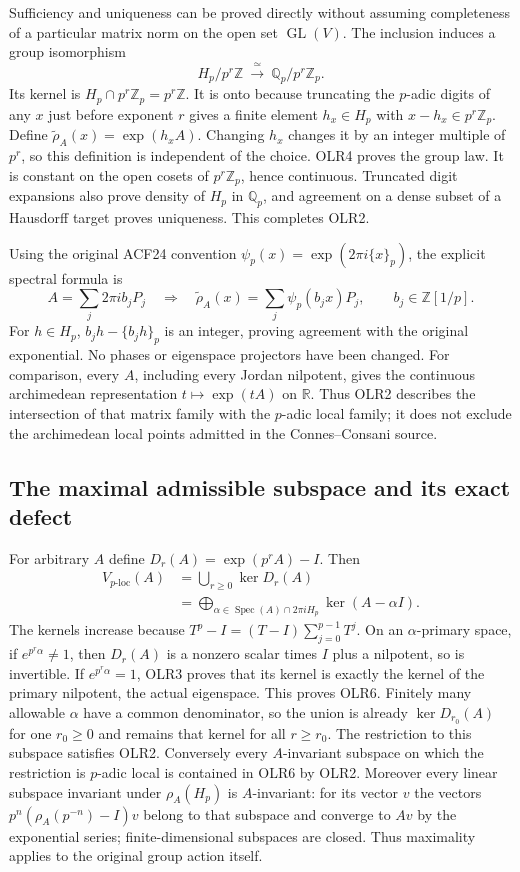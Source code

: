 Sufficiency and uniqueness can be proved directly without assuming
completeness of a particular matrix norm on the open set
$\operatorname{GL}(V)$. The inclusion induces a group isomorphism
\[
H_p/p^r\mathbb Z\ \xrightarrow{\ \simeq\ }\
                    \mathbb Q_p/p^r\mathbb Z_p.
\tag{OLR4}
\]
Its kernel is $H_p\cap p^r\mathbb Z_p=p^r\mathbb Z$.
It is onto because truncating the $p$-adic digits of any $x$ just
before exponent $r$ gives a finite element $h_x\in H_p$ with
$x-h_x\in p^r\mathbb Z_p$. Define
$\widetilde\rho_A(x)=\exp(h_xA)$.
Changing $h_x$ changes it by an integer multiple of $p^r$, so this
definition is independent of the choice. OLR4 proves the group law.
It is constant on the open cosets of $p^r\mathbb Z_p$, hence
continuous. Truncated digit expansions also prove density of $H_p$
in $\mathbb Q_p$, and agreement on a dense subset of a Hausdorff
target proves uniqueness. This completes OLR2.

Using the original ACF24 convention
$\psi_p(x)=\exp(2\pi i\{x\}_p)$, the explicit spectral formula is
\[
A=\sum_j2\pi i b_jP_j\quad\Longrightarrow\quad
\widetilde\rho_A(x)=\sum_j\psi_p(b_jx)P_j,
\qquad b_j\in\mathbb Z[1/p].
\tag{OLR5}
\]
For $h\in H_p$, $b_jh-\{b_jh\}_p$ is an integer, proving agreement
with the original exponential. No phases or eigenspace projectors
have been changed.
For comparison, every $A$, including every Jordan nilpotent, gives
the continuous archimedean representation $t\mapsto\exp(tA)$ on
$\mathbb R$. Thus OLR2 describes the intersection of that matrix
family with the $p$-adic local family; it does not exclude the
archimedean local points admitted in the Connes--Consani source.

\subsection{The maximal admissible subspace and its exact defect}

For arbitrary $A$ define $D_r(A)=\exp(p^rA)-I$. Then
\[
\begin{split}
V_{p\text{-loc}}(A)
&=\bigcup_{r\ge0}\ker D_r(A)\\
&=\bigoplus_{\alpha\in\operatorname{Spec}(A)\cap2\pi iH_p}
                             \ker(A-\alpha I).
\end{split}
\tag{OLR6}
\]
The kernels increase because $T^p-I=(T-I)\sum_{j=0}^{p-1}T^j$.
On an $\alpha$-primary space, if $e^{p^r\alpha}\ne1$, then
$D_r(A)$ is a nonzero scalar times $I$ plus a nilpotent, so is
invertible. If $e^{p^r\alpha}=1$, OLR3 proves that its kernel is
exactly the kernel of the primary nilpotent, the actual eigenspace.
This proves OLR6. Finitely many allowable $\alpha$ have a common
denominator, so the union is already $\ker D_{r_0}(A)$ for one
$r_0\ge0$ and remains that kernel for all $r\ge r_0$.
The restriction to this subspace satisfies OLR2. Conversely every
$A$-invariant subspace on which the restriction is $p$-adic local is
contained in OLR6 by OLR2. Moreover every linear subspace invariant
under $\rho_A(H_p)$ is $A$-invariant: for its vector $v$ the vectors
$p^n(\rho_A(p^{-n})-I)v$ belong to that subspace and converge to
$Av$ by the exponential series; finite-dimensional subspaces are
closed. Thus maximality applies to the original group action itself.

